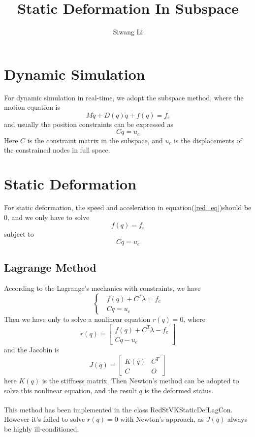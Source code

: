 \documentclass[twocolumn]{article}
\author{Siwang Li}
\title{Static Deformation In Subspace}
\begin{document}
\maketitle

\section{Dynamic Simulation}
For dynamic simulation in real-time, we adopt the subspace method, where the
motion equation is
\begin{equation}\label{red_eq}
M\ddot{q} + D(q)\dot{q} + f(q) = f_{e}
\end{equation}
and usually the position constraints can be expressed as
\[
{C} q = u_c
\]
Here ${C}$ is the constraint matrix in the subspace, and $u_c$ is the
displacements of the constrained nodes in full space.

\section{Static Deformation}
For static deformation, the speed and acceleration in
equation(\ref{red_eq})should be 0, and we only have to solve
\[
f(q) = f_{e}
\]
subject to
\[
{C} q = u_c
\]
\subsection{Lagrange Method}
According to the Lagrange's mechanics with constraints, we have
\begin{equation}\label{lag_1}
  \left\{ \begin{array}{rl}
      &f(q) + C^T\lambda = f_{e} \\
      &Cq = u_c
    \end{array} \right.
\end{equation}
Then we have only to solve a nonlinear equation $r(q) = 0$, where  
\[
r(q) =   \left[ \begin{array}{c}
    f(q)+C^T\lambda - f_{e}\\
    Cq - u_c
  \end{array} \right]
\]
and the Jacobin is
\[
J(q) = \left[ \begin{array}{cc}
    K(q) & C^T\\
    C & O
  \end{array} \right]
\]
here $K(q)$ is the stiffness matrix. Then Newton's method can be adopted to
solve this nonlinear equation, and the result $q$ is the deformed status. \\\\
This method has been implemented in the class RedStVKStaticDefLagCon. However
it's failed to solve $r(q)=0$ with Newton's approach, as $J(q)$ always be highly
ill-conditioned.
\end{document}
